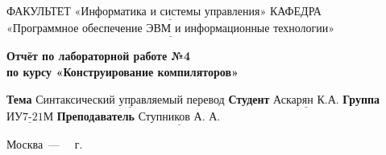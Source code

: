 \begin{titlepage}
	
	\noindent ФАКУЛЬТЕТ $\underline{\text{«Информатика и системы управления»}}$ \newline\newline
	\noindent КАФЕДРА $\underline{\text{«Программное обеспечение ЭВМ и информационные технологии»}}$\newline\newline\newline\newline\newline\newline\newline
	
	\vspace{\baselineskip}

	\begin{center}
		\Large\textbf{Отчёт по лабораторной работе №4} \\
		\Large\textbf{по курсу «Конструирование компиляторов»} \\

	\end{center}
	\begin{center}
		\large{}
	\end{center}
	\vspace{2.5cm}
	
	\noindent\textbf{Тема} $\underline{\text{Синтаксический управляемый перевод}}$\newline\newline
	\noindent\textbf{Студент} $\underline{\text{Аскарян К.А.}}$\newline\newline
	\noindent\textbf{Группа} $\underline{\text{ИУ7-21М}}$\newline\newline
	\noindent\textbf{Преподаватель} $\underline{\text{Ступников~А.~А.}}$\newline
	
	\begin{center}
		\vfill
		Москва~---~\the\year
		~г.
	\end{center}
	\restoregeometry
\end{titlepage}
